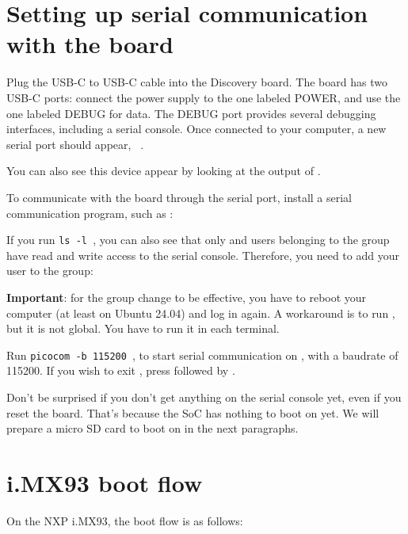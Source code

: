 \section{Setting up serial communication with the board}

Plug the USB-C to USB-C cable into the Discovery board. The board has
two USB-C ports: connect the power supply to the one labeled POWER,
and use the one labeled DEBUG for data. The DEBUG port provides
several debugging interfaces, including a serial console. Once
connected to your computer, a new serial port should appear, {\tt
  \hosttty}.

You can also see this device appear by looking at the output of
.

To communicate with the board through the serial port, install a
serial communication program, such as :


If you run {\tt ls -l \hosttty}, you can also see that only
 and users belonging to the  group have
read and write access to the serial console. Therefore, you need
to add your user to the  group:


{\bf Important}: for the group change to be effective, you have to
reboot your computer (at least on Ubuntu 24.04) and log in again.
A workaround is to run , but it is not global.
You have to run it in each terminal.

Run {\tt picocom -b 115200 \hosttty}, to start serial
communication on {\tt \hosttty}, with a baudrate of 115200.
If you wish to exit , press \code{[Ctrl][a]} followed by
\code{[Ctrl][x]}.

Don't be surprised if you don't get anything on the serial console yet,
even if you reset the board. That's because the SoC has nothing to boot
on yet. We will prepare a micro SD card to boot on in the next paragraphs.

\section{i.MX93 boot flow}

On the NXP i.MX93, the boot flow is as follows:

